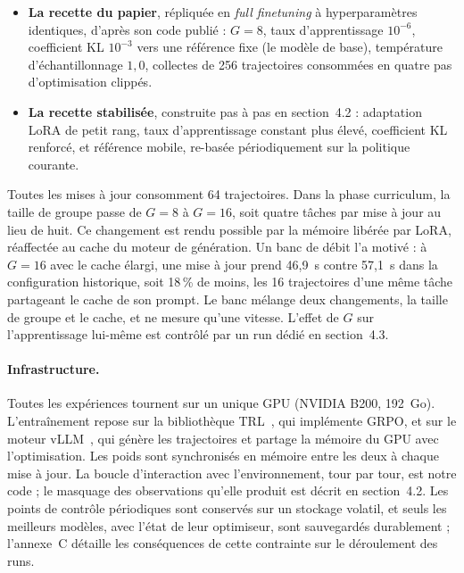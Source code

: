 \documentclass[11pt,a4paper]{article}
\begin{document}
\begin{itemize}
    \item \textbf{La recette du papier}, répliquée en \emph{full finetuning} à hyperparamètres identiques, d'après son code publié : $G=8$, taux d'apprentissage $10^{-6}$, coefficient KL $10^{-3}$ vers une référence fixe (le modèle de base), température d'échantillonnage $1{,}0$, collectes de 256 trajectoires consommées en quatre pas d'optimisation clippés.
    \item \textbf{La recette stabilisée}, construite pas à pas en section~4.2 : adaptation LoRA de petit rang, taux d'apprentissage constant plus élevé, coefficient KL renforcé, et référence mobile, re-basée périodiquement sur la politique courante.
\end{itemize}

Toutes les mises à jour consomment 64 trajectoires. Dans la phase curriculum, la taille de groupe passe de $G=8$ à $G=16$, soit quatre tâches par mise à jour au lieu de huit. Ce changement est rendu possible par la mémoire libérée par LoRA, réaffectée au cache du moteur de génération. Un banc de débit l'a motivé : à $G=16$ avec le cache élargi, une mise à jour prend 46{,}9~s contre 57{,}1~s dans la configuration historique, soit 18\,\% de moins, les 16 trajectoires d'une même tâche partageant le cache de son prompt. Le banc mélange deux changements, la taille de groupe et le cache, et ne mesure qu'une vitesse. L'effet de $G$ sur l'apprentissage lui-même est contrôlé par un run dédié en section~4.3.



\paragraph{Infrastructure.} Toutes les expériences tournent sur un unique GPU (NVIDIA B200, 192~Go). L'entraînement repose sur la bibliothèque TRL~\cite{vonwerra2020trl}, qui implémente GRPO, et sur le moteur vLLM~\cite{kwon2023vllm}, qui génère les trajectoires et partage la mémoire du GPU avec l'optimisation. Les poids sont synchronisés en mémoire entre les deux à chaque mise à jour. La boucle d'interaction avec l'environnement, tour par tour, est notre code ; le masquage des observations qu'elle produit est décrit en section~4.2. Les points de contrôle périodiques sont conservés sur un stockage volatil, et seuls les meilleurs modèles, avec l'état de leur optimiseur, sont sauvegardés durablement ; l'annexe~C détaille les conséquences de cette contrainte sur le déroulement des runs. 
\end{document}
